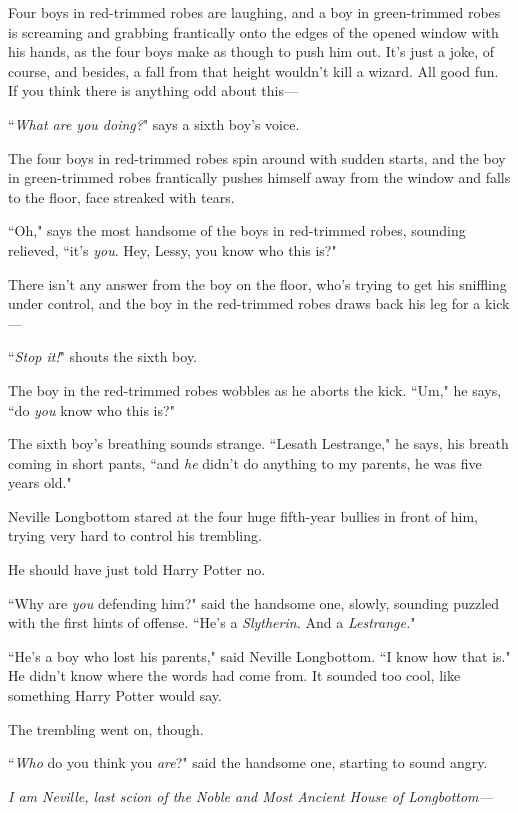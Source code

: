 Four boys in red-trimmed robes are laughing, and a boy in green-trimmed robes is screaming and grabbing frantically onto the edges of the opened window with his hands, as the four boys make as though to push him out. It's just a joke, of course, and besides, a fall from that height wouldn't kill a wizard. All good fun. If you think there is anything odd about this---

``\emph{What are you doing?}" says a sixth boy's voice.

The four boys in red-trimmed robes spin around with sudden starts, and the boy in green-trimmed robes frantically pushes himself away from the window and falls to the floor, face streaked with tears.

``Oh," says the most handsome of the boys in red-trimmed robes, sounding relieved, ``it's \emph{you}. Hey, Lessy, you know who this is?"

There isn't any answer from the boy on the floor, who's trying to get his sniffling under control, and the boy in the red-trimmed robes draws back his leg for a kick---

``\emph{Stop it!}" shouts the sixth boy.

The boy in the red-trimmed robes wobbles as he aborts the kick. ``Um," he says, ``do \emph{you} know who this is?"

The sixth boy's breathing sounds strange. ``Lesath Lestrange," he says, his breath coming in short pants, ``and \emph{he} didn't do anything to my parents, he was five years old."

\later

Neville Longbottom stared at the four huge fifth-year bullies in front of him, trying very hard to control his trembling.

He should have just told Harry Potter no.

``Why are \emph{you} defending him?" said the handsome one, slowly, sounding puzzled with the first hints of offense. ``He's a \emph{Slytherin.} And a \emph{Lestrange.}"

``He's a boy who lost his parents," said Neville Longbottom. ``I know how that is." He didn't know where the words had come from. It sounded too cool, like something Harry Potter would say.

The trembling went on, though.

``\emph{Who} do you think you \emph{are}?" said the handsome one, starting to sound angry.

\emph{I am Neville, last scion of the Noble and Most Ancient House of Longbottom---}


